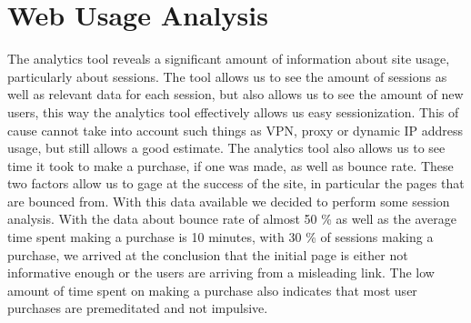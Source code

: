 \section{Web Usage Analysis}
The analytics tool reveals a significant amount of information about site usage, particularly about sessions.
The tool allows us to see the amount of sessions as well as relevant data for each session, but also allows us to see the amount of new users, this way the analytics tool effectively allows us easy sessionization.
This of cause cannot take into account such things as VPN, proxy or dynamic IP address usage, but still allows a good estimate.
The analytics tool also allows us to see time it took to make a purchase, if one was made, as well as bounce rate.
These two factors allow us to gage at the success of the site, in particular the pages that are bounced from.
With this data available we decided to perform some session analysis.
With the data about bounce rate of almost 50 \% as well as the average time spent making a purchase is 10 minutes, with 30 \% of sessions making a purchase, we arrived at the conclusion that the initial page is either not informative enough or the users are arriving from a misleading link.
The low amount of time spent on making a purchase also indicates that most user purchases are premeditated and not impulsive.